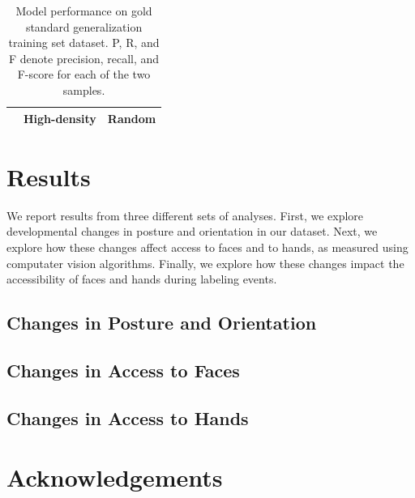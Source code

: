 \documentclass[10pt, letterpaper]{article}
\begin{document}
\begin{table}[t]
  \caption{Model performance on gold standard generalization training set dataset. P, R, and F denote precision, recall, and F-score for each of the two samples. \label{tab:model_eval}}
  \begin{center}
    \begin{tabular}{l|ccc|ccc}
      \hline
       &  \multicolumn{3}{c|}{High-density} &  \multicolumn{3}{c}{Random} \\
      \hline
    \hline
    \end{tabular}
  \end{center}
\end{table}

\section{Results}\label{results}

We report results from three different sets of analyses. First, we
explore developmental changes in posture and orientation in our dataset.
Next, we explore how these changes affect access to faces and to hands,
as measured using computater vision algorithms. Finally, we explore how
these changes impact the accessibility of faces and hands during
labeling events.

\subsection{Changes in Posture and
Orientation}\label{changes-in-posture-and-orientation}

\subsection{Changes in Access to
Faces}\label{changes-in-access-to-faces}

\subsection{Changes in Access to
Hands}\label{changes-in-access-to-hands}

\section{Acknowledgements}\label{acknowledgements}
\end{document}
